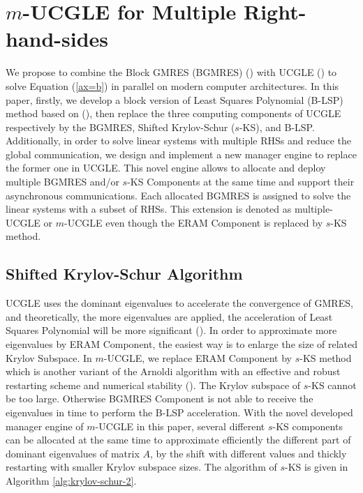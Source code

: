 \section{$m$-UCGLE for Multiple Right-hand-sides}

We propose to combine the Block GMRES (BGMRES) (\cite{vital1990etude}) with UCGLE (\cite{wu2018distributed}) to solve Equation (\ref{ax=b}) in parallel on modern computer architectures. In this paper, firstly, we develop a block version of Least Squares Polynomial (B-LSP) method based on (\cite{saad1987least}), then replace the three computing components of UCGLE respectively by the BGMRES, Shifted Krylov-Schur ($s$-KS), and B-LSP. Additionally, in order to solve linear systems with multiple RHSs and reduce the global communication, we design and implement a new manager engine to replace the former one in UCGLE. This novel engine allows to allocate and deploy multiple BGMRES and/or $s$-KS Components at the same time and support their asynchronous communications. Each allocated BGMRES is assigned to solve the linear systems with a subset of RHSs. This extension is denoted as multiple-UCGLE or $m$-UCGLE even though the ERAM Component is replaced by $s$-KS method. 

\subsection{Shifted Krylov-Schur Algorithm}

UCGLE uses the dominant eigenvalues to accelerate the convergence of GMRES, and theoretically, the more eigenvalues are applied, the acceleration of Least Squares Polynomial will be more significant (\cite{wu2018distributed}).  In order to approximate more eigenvalues by ERAM Component, the easiest way is to enlarge the size of related Krylov Subspace. In $m$-UCGLE, we replace ERAM Component by $s$-KS method which is another variant of the Arnoldi algorithm with an effective and robust restarting scheme and numerical stability (\cite{stewart2002krylov}). The Krylov subspace of  $s$-KS cannot be too large. Otherwise BGMRES Component is not able to receive the eigenvalues in time to perform the B-LSP acceleration. With the novel developed manager engine of $m$-UCGLE in this paper, several different $s$-KS components can be allocated at the same time to approximate efficiently the different part of dominant eigenvalues of matrix $A$, by the shift with different values and thickly restarting with smaller Krylov subspace sizes. The algorithm of $s$-KS is given in Algorithm \ref{alg:krylov-schur-2}.

